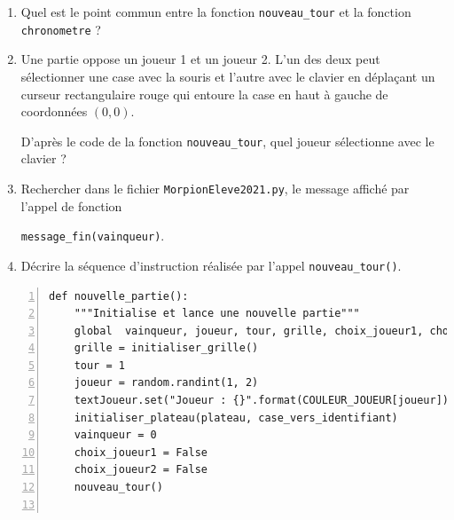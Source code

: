 \documentclass[a4paper, french, 12pt]{article}  %
\newcounter{exo}
\newcounter{exoB}
\newenvironment{exerciceB2}
{\par \bigskip  \noindent \addtocounter{exoB}{1} \hrulefill \quad { \large \textbf{Exercice \theexoB}} \quad \hrulefill \par \medskip }
{\par \bigskip }
\newcounter{def}
\begin{document}
\begin{exerciceB2}{}
\begin{enumerate}
\begin{enumerate}
	\item Quel est le point commun entre la fonction \lstinline+nouveau_tour+ et la fonction \lstinline+chronometre+ ?
	
	\item Une partie oppose un joueur 1 et un joueur 2. L'un des deux peut sélectionner une case avec la souris et l'autre avec le clavier en déplaçant un curseur rectangulaire rouge qui entoure la case en haut à gauche de coordonnées $(0,0)$.
	
D'après le code de la fonction \lstinline+nouveau_tour+, quel joueur sélectionne avec le clavier ?

\item Rechercher dans le fichier \lstinline+MorpionEleve2021.py+, le message affiché par l'appel de fonction

 \lstinline+message_fin(vainqueur)+.
\item Décrire la séquence d'instruction réalisée par l'appel \lstinline+nouveau_tour()+.

\end{enumerate}

\begin{lstlisting}[numbers=left]
def nouvelle_partie():
    """Initialise et lance une nouvelle partie"""
    global  vainqueur, joueur, tour, grille, choix_joueur1, choix_joueur2
    grille = initialiser_grille()
    tour = 1
    joueur = random.randint(1, 2)
    textJoueur.set("Joueur : {}".format(COULEUR_JOUEUR[joueur]))
    initialiser_plateau(plateau, case_vers_identifiant)
    vainqueur = 0
    choix_joueur1 = False
    choix_joueur2 = False
    nouveau_tour()
    

\end{lstlisting}
\end{enumerate}
\end{exerciceB2}
\end{document}

